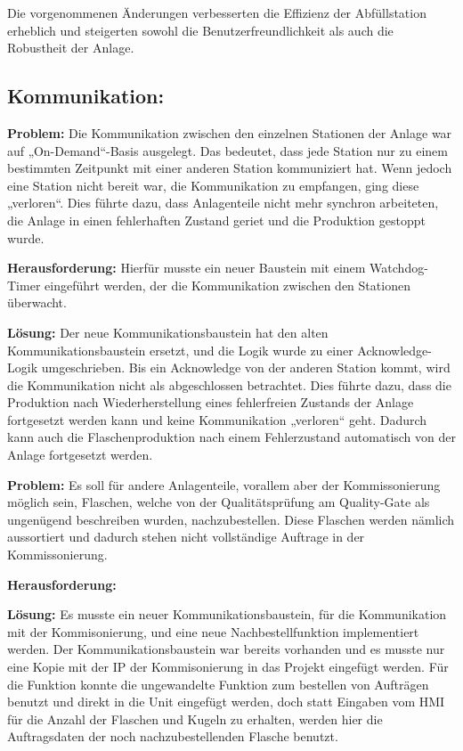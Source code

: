 Die vorgenommenen Änderungen verbesserten die Effizienz der Abfüllstation erheblich und steigerten sowohl die Benutzerfreundlichkeit als 
auch die Robustheit der Anlage.

\subsection{Kommunikation:} 

\textbf{Problem:}  
Die Kommunikation zwischen den einzelnen Stationen der Anlage war auf „On-Demand“-Basis ausgelegt. Das bedeutet, dass jede Station nur zu 
einem bestimmten Zeitpunkt mit einer anderen Station kommuniziert hat. Wenn jedoch eine Station nicht bereit war, die Kommunikation zu 
empfangen, ging diese „verloren“. Dies führte dazu, dass Anlagenteile nicht mehr synchron arbeiteten, die Anlage in einen fehlerhaften 
Zustand geriet und die Produktion gestoppt wurde.

\textbf{Herausforderung:}  
Hierfür musste ein neuer Baustein mit einem Watchdog-Timer eingeführt werden, der die Kommunikation zwischen den Stationen überwacht.

\textbf{Lösung:}  
Der neue Kommunikationsbaustein hat den alten Kommunikationsbaustein ersetzt, und die Logik wurde zu einer Acknowledge-Logik umgeschrieben. 
Bis ein Acknowledge von der anderen Station kommt, wird die Kommunikation nicht als abgeschlossen betrachtet. Dies führte dazu, dass die 
Produktion nach Wiederherstellung eines fehlerfreien Zustands der Anlage fortgesetzt werden kann und keine Kommunikation „verloren“ geht.
Dadurch kann auch die Flaschenproduktion nach einem Fehlerzustand automatisch von der Anlage fortgesetzt werden.

\textbf{Problem:}  
Es soll für andere Anlagenteile, vorallem aber der Kommissonierung möglich sein, Flaschen, welche von der Qualitätsprüfung am Quality-Gate als ungenügend beschreiben wurden, nachzubestellen. Diese Flaschen werden nämlich aussortiert und dadurch stehen nicht vollständige Auftrage in der Kommissonierung.

\textbf{Herausforderung:} 


\textbf{Lösung:}  
Es musste ein neuer Kommunikationsbaustein, für die Kommunikation mit der Kommisonierung, und eine neue Nachbestellfunktion implementiert werden. Der Kommunikationsbaustein war bereits vorhanden und es musste nur eine Kopie mit der IP der Kommisonierung in das Projekt eingefügt werden. Für die Funktion konnte die ungewandelte Funktion zum bestellen von Aufträgen benutzt und direkt in die Unit eingefügt werden, doch statt Eingaben vom HMI für die Anzahl der Flaschen und Kugeln zu erhalten, werden hier die Auftragsdaten der noch nachzubestellenden Flasche benutzt.
